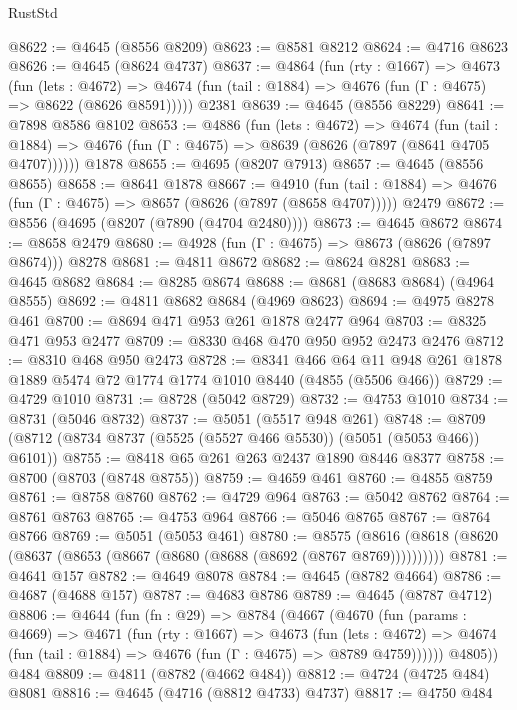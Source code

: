 \begin{lexlean}{RustStd}
\begin{coremodule}
@8622 := @4645 (@8556 @8209)
@8623 := @8581 @8212
@8624 := @4716 @8623
@8626 := @4645 (@8624 @4737)
@8637 := @4864
    (fun (rty : @1667) =>
    @4673
      (fun (lets : @4672) =>
      @4674 (fun (tail : @1884) => @4676 (fun (Γ : @4675) => @8622 (@8626 @8591)))))
    @2381
@8639 := @4645 (@8556 @8229)
@8641 := @7898 @8586 @8102
@8653 := @4886
    (fun (lets : @4672) =>
    @4674
      (fun (tail : @1884) => @4676 (fun (Γ : @4675) => @8639 (@8626 (@7897 (@8641 @4705 @4707))))))
    @1878
@8655 := @4695 (@8207 @7913)
@8657 := @4645 (@8556 @8655)
@8658 := @8641 @1878
@8667 := @4910
    (fun (tail : @1884) => @4676 (fun (Γ : @4675) => @8657 (@8626 (@7897 (@8658 @4707)))))
    @2479
@8672 := @8556 (@4695 (@8207 (@7890 (@4704 @2480))))
@8673 := @4645 @8672
@8674 := @8658 @2479
@8680 := @4928 (fun (Γ : @4675) => @8673 (@8626 (@7897 @8674))) @8278
@8681 := @4811 @8672
@8682 := @8624 @8281
@8683 := @4645 @8682
@8684 := @8285 @8674
@8688 := @8681 (@8683 @8684) (@4964 @8555)
@8692 := @4811 @8682 @8684 (@4969 @8623)
@8694 := @4975 @8278 @461
@8700 := @8694 @471 @953 @261 @1878 @2477 @964
@8703 := @8325 @471 @953 @2477
@8709 := @8330 @468 @470 @950 @952 @2473 @2476
@8712 := @8310 @468 @950 @2473
@8728 := @8341
    @466
    @64
    @11
    @948
    @261
    @1878
    @1889
    @5474
    @72
    @1774
    @1774
    @1010
    @8440
    (@4855 (@5506 @466))
@8729 := @4729 @1010
@8731 := @8728 (@5042 @8729)
@8732 := @4753 @1010
@8734 := @8731 (@5046 @8732)
@8737 := @5051 (@5517 @948 @261)
@8748 := @8709 (@8712 (@8734 @8737 (@5525 (@5527 @466 @5530)) (@5051 (@5053 @466)) @6101))
@8755 := @8418 @65 @261 @263 @2437 @1890 @8446 @8377
@8758 := @8700 (@8703 (@8748 @8755))
@8759 := @4659 @461
@8760 := @4855 @8759
@8761 := @8758 @8760
@8762 := @4729 @964
@8763 := @5042 @8762
@8764 := @8761 @8763
@8765 := @4753 @964
@8766 := @5046 @8765
@8767 := @8764 @8766
@8769 := @5051 (@5053 @461)
@8780 := @8575 (@8616 (@8618 (@8620 (@8637 (@8653 (@8667 (@8680 (@8688 (@8692 (@8767 @8769))))))))))
@8781 := @4641 @157
@8782 := @4649 @8078
@8784 := @4645 (@8782 @4664)
@8786 := @4687 (@4688 @157)
@8787 := @4683 @8786
@8789 := @4645 (@8787 @4712)
@8806 := @4644
    (fun (fn : @29) =>
    @8784
      (@4667
        (@4670
          (fun (params : @4669) =>
          @4671
            (fun (rty : @1667) =>
            @4673
              (fun (lets : @4672) =>
              @4674 (fun (tail : @1884) => @4676 (fun (Γ : @4675) => @8789 @4759))))))
        @4805))
    @484
@8809 := @4811 (@8782 (@4662 @484))
@8812 := @4724 (@4725 @484) @8081
@8816 := @4645 (@4716 (@8812 @4733) @4737)
@8817 := @4750 @484

\end{coremodule}
\end{lexlean}
